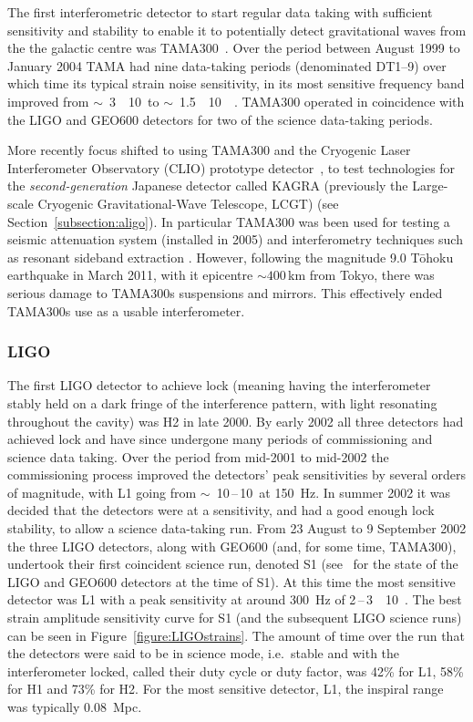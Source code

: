 The first interferometric detector to start regular data taking with sufficient sensitivity and stability to 
enable it to potentially detect gravitational waves from the the galactic centre was 
TAMA300~\cite{Ando:2001}. Over the period between August 1999 to January 2004 TAMA had nine data-taking 
periods (denominated DT1--9) over which time its typical strain noise sensitivity, in its most sensitive 
frequency band improved from $\sim$~3~\texttimes~10~\Hz to
$\sim$~1.5~\texttimes~10~\Hz~\cite{Akutsu:2006}. TAMA300 operated in coincidence with the LIGO and 
GEO600 detectors for two of the science data-taking periods.

More recently focus shifted to using TAMA300 and the Cryogenic Laser Interferometer Observatory (CLIO) 
prototype detector~\cite{Yamamoto:2008, CLIOweb}, to test technologies for the \textit{second-generation} 
Japanese detector called KAGRA (previously  the Large-scale Cryogenic Gravitational-Wave Telescope, LCGT) (see 
Section~\ref{subsection:aligo}). In particular TAMA300 was been used for testing a seismic attenuation system 
(installed in 2005) and interferometry techniques such as resonant sideband extraction \cite{Arai:2009}. 
However, following the magnitude 9.0 T\={o}hoku earthquake in March 2011, with it epicentre $\sim 400$\,km 
from Tokyo, there was serious damage to TAMA300s suspensions and mirrors. This effectively ended TAMA300s use 
as a usable interferometer.

\subsubsection{LIGO}
\label{sec:ligoruns} 

The first LIGO detector to achieve lock (meaning having the interferometer stably held on a dark fringe of 
the interference pattern, with light resonating throughout the cavity) was H2 in late 2000. By early 2002 all 
three detectors had achieved lock and have since undergone many periods of commissioning and science data 
taking. Over the period from mid-2001 to mid-2002 the commissioning process improved the detectors' peak 
sensitivities by several orders of magnitude, with L1 going from
$\sim$~10\,--\,10~\Hz at 150~Hz. In summer 2002 it was decided that the detectors were 
at a sensitivity, and had a good enough lock stability, to allow a science data-taking run. From 23 August to 
9 September 2002 the three LIGO detectors, along with GEO600 (and, for some time, TAMA300), undertook their 
first coincident science run, denoted S1 (see~\cite{Abbott:2004a} for the state of the LIGO and GEO600 
detectors at the time of S1). At this time the most sensitive detector was L1 with a peak sensitivity at 
around 300~Hz of 2\,--\,3~\texttimes~10~\Hz. The best strain amplitude sensitivity curve for S1 
(and the subsequent LIGO science runs) can be seen in Figure~\ref{figure:LIGOstrains}. The amount of time over 
the run that the detectors were said to be in science mode, i.e.\ stable and with the interferometer locked, 
called their duty cycle or duty factor, was 42\% for L1, 58\% for H1 and 73\% for H2. For the most sensitive 
detector, L1, the inspiral range was typically 0.08~Mpc.

